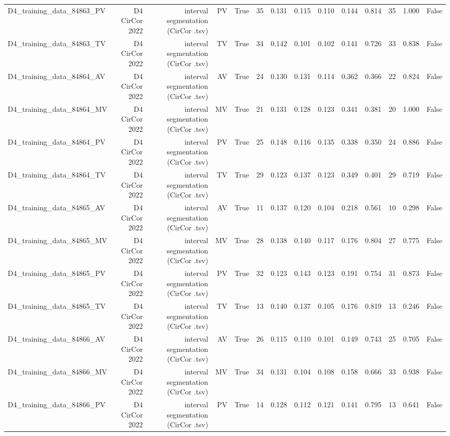 \begin{table}[htbp]
\begin{tabular}{lrrrrrrrrrrrrr}
    D4\_training\_data\_84863\_PV & D4 CirCor 2022 & interval segmentation (CirCor .tsv) & PV & True & 35 & 0.131 & 0.115 & 0.110 & 0.144 & 0.814 & 35 & 1.000 & False \\
    D4\_training\_data\_84863\_TV & D4 CirCor 2022 & interval segmentation (CirCor .tsv) & TV & True & 34 & 0.142 & 0.101 & 0.102 & 0.141 & 0.726 & 33 & 0.838 & False \\
    D4\_training\_data\_84864\_AV & D4 CirCor 2022 & interval segmentation (CirCor .tsv) & AV & True & 24 & 0.130 & 0.131 & 0.114 & 0.362 & 0.366 & 22 & 0.824 & False \\
    D4\_training\_data\_84864\_MV & D4 CirCor 2022 & interval segmentation (CirCor .tsv) & MV & True & 21 & 0.131 & 0.128 & 0.123 & 0.341 & 0.381 & 20 & 1.000 & False \\
    D4\_training\_data\_84864\_PV & D4 CirCor 2022 & interval segmentation (CirCor .tsv) & PV & True & 25 & 0.148 & 0.116 & 0.135 & 0.338 & 0.350 & 24 & 0.886 & False \\
    D4\_training\_data\_84864\_TV & D4 CirCor 2022 & interval segmentation (CirCor .tsv) & TV & True & 29 & 0.123 & 0.137 & 0.123 & 0.349 & 0.401 & 29 & 0.719 & False \\
    D4\_training\_data\_84865\_AV & D4 CirCor 2022 & interval segmentation (CirCor .tsv) & AV & True & 11 & 0.137 & 0.120 & 0.104 & 0.218 & 0.561 & 10 & 0.298 & False \\
    D4\_training\_data\_84865\_MV & D4 CirCor 2022 & interval segmentation (CirCor .tsv) & MV & True & 28 & 0.138 & 0.140 & 0.117 & 0.176 & 0.804 & 27 & 0.775 & False \\
    D4\_training\_data\_84865\_PV & D4 CirCor 2022 & interval segmentation (CirCor .tsv) & PV & True & 32 & 0.123 & 0.143 & 0.123 & 0.191 & 0.754 & 31 & 0.873 & False \\
    D4\_training\_data\_84865\_TV & D4 CirCor 2022 & interval segmentation (CirCor .tsv) & TV & True & 13 & 0.140 & 0.137 & 0.105 & 0.176 & 0.819 & 13 & 0.246 & False \\
    D4\_training\_data\_84866\_AV & D4 CirCor 2022 & interval segmentation (CirCor .tsv) & AV & True & 26 & 0.115 & 0.110 & 0.101 & 0.149 & 0.743 & 25 & 0.705 & False \\
    D4\_training\_data\_84866\_MV & D4 CirCor 2022 & interval segmentation (CirCor .tsv) & MV & True & 34 & 0.131 & 0.104 & 0.108 & 0.158 & 0.666 & 33 & 0.938 & False \\
    D4\_training\_data\_84866\_PV & D4 CirCor 2022 & interval segmentation (CirCor .tsv) & PV & True & 14 & 0.128 & 0.112 & 0.121 & 0.141 & 0.795 & 13 & 0.641 & False \\

\end{tabular}
\end{table}

